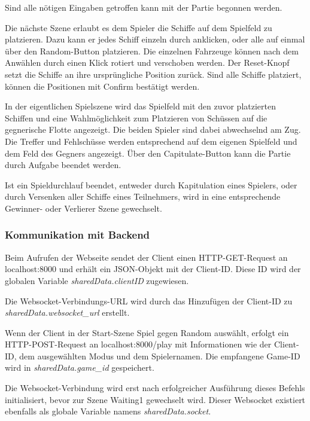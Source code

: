 \documentclass[a4paper, 10pt, conference]{IEEEtran}
\begin{document}

Sind alle nötigen Eingaben getroffen kann mit der Partie begonnen werden.

Die nächste Szene erlaubt es dem Spieler die Schiffe auf dem Spielfeld zu platzieren. Dazu kann er jedes Schiff einzeln durch anklicken, oder alle auf einmal über den Random-Button platzieren. Die einzelnen Fahrzeuge können nach dem Anwählen durch einen Klick rotiert und verschoben werden. Der Reset-Knopf setzt die Schiffe an ihre ursprüngliche Position zurück. Sind alle Schiffe platziert, können die Positionen mit Confirm bestätigt werden.

In der eigentlichen Spielszene wird das Spielfeld mit den zuvor platzierten Schiffen und eine Wahlmöglichkeit zum Platzieren von Schüssen auf die gegnerische Flotte angezeigt. Die beiden Spieler sind dabei abwechselnd am Zug. Die Treffer und Fehlschüsse werden entsprechend auf dem eigenen Spielfeld und dem Feld des Gegners angezeigt. Über den Capitulate-Button kann die Partie durch Aufgabe beendet werden. 

Ist ein Spieldurchlauf beendet, entweder durch Kapitulation eines Spielers, oder durch Versenken aller Schiffe eines Teilnehmers, wird in eine entsprechende Gewinner- oder Verlierer Szene gewechselt.




\subsubsection{Kommunikation mit Backend}\label{subsec:comwithbackend}

Beim Aufrufen der Webseite sendet der Client einen HTTP-GET-Request an \glqq localhost:8000\grqq{} und erhält ein JSON-Objekt mit der Client-ID. Diese ID wird der globalen Variable \textit{sharedData.clientID} zugewiesen.

Die Websocket-Verbindungs-URL wird durch das Hinzufügen der Client-ID zu \textit{sharedData.websocket\_url} erstellt.

Wenn der Client in der Start-Szene \glqq Spiel gegen Random\grqq{} auswählt, erfolgt ein HTTP-POST-Request an \glqq localhost:8000/play\grqq{} mit Informationen wie der Client-ID, dem ausgewählten Modus und dem Spielernamen. Die empfangene Game-ID wird in \textit{sharedData.game\_id} gespeichert.

Die Websocket-Verbindung wird erst nach erfolgreicher Ausführung dieses Befehls initialisiert, bevor zur Szene \glqq Waiting1\grqq{} gewechselt wird. Dieser Websocket existiert ebenfalls als globale Variable namens \textit{sharedData.socket}.
\end{document}
